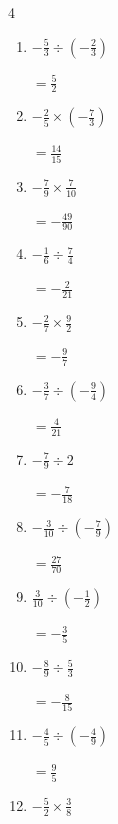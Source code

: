 \begin{multicols}{4}
\begin{enumerate}
  \item $\displaystyle -\frac{5}{3}\div{}\left(-\frac{2}{3}\right)$

        $\displaystyle =\frac{5}{2}$

  \item $\displaystyle -\frac{2}{5}\times{}\left(-\frac{7}{3}\right)$

        $\displaystyle =\frac{14}{15}$

  \item $\displaystyle -\frac{7}{9}\times{}\frac{7}{10}$

        $\displaystyle =-\frac{49}{90}$

  \item $\displaystyle -\frac{1}{6}\div{}\frac{7}{4}$

        $\displaystyle =-\frac{2}{21}$

  \item $\displaystyle -\frac{2}{7}\times{}\frac{9}{2}$

        $\displaystyle =-\frac{9}{7}$

  \item $\displaystyle -\frac{3}{7}\div{}\left(-\frac{9}{4}\right)$

        $\displaystyle =\frac{4}{21}$

  \item $\displaystyle -\frac{7}{9}\div{}2$

        $\displaystyle =-\frac{7}{18}$

  \item $\displaystyle -\frac{3}{10}\div{}\left(-\frac{7}{9}\right)$

        $\displaystyle =\frac{27}{70}$

  \item $\displaystyle \frac{3}{10}\div{}\left(-\frac{1}{2}\right)$

        $\displaystyle =-\frac{3}{5}$

  \item $\displaystyle -\frac{8}{9}\div{}\frac{5}{3}$

        $\displaystyle =-\frac{8}{15}$

\columnbreak %

\resetques

  \item $\displaystyle -\frac{4}{5}\div{}\left(-\frac{4}{9}\right)$

        $\displaystyle =\frac{9}{5}$

  \item $\displaystyle -\frac{5}{2}\times{}\frac{3}{8}$


\end{enumerate}
\end{multicols}
